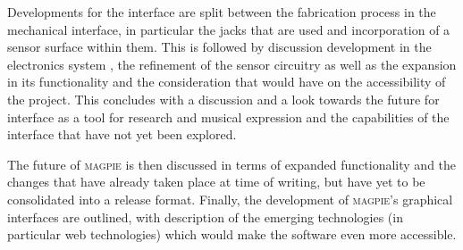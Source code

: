 Developments for the interface are split between the fabrication process in the
mechanical interface, in particular the jacks that are used and incorporation of
a sensor surface within them. This is followed by discussion development in the
electronics system , the refinement of the sensor circuitry as well as the
expansion in its functionality and the consideration that would have on the
accessibility of the project. This concludes with a discussion and a look
towards the future for interface as a tool for research and musical expression
and the capabilities of the interface that have not yet been explored.

The future of \textsc{magpie} is then discussed in terms of expanded
functionality and the changes that have already taken place at time of writing,
but have yet to be consolidated into a release format. Finally, the  development
of \textsc{magpie}'s graphical interfaces are outlined, with description of the
emerging technologies (in particular web technologies) which would make the
software even more accessible.




